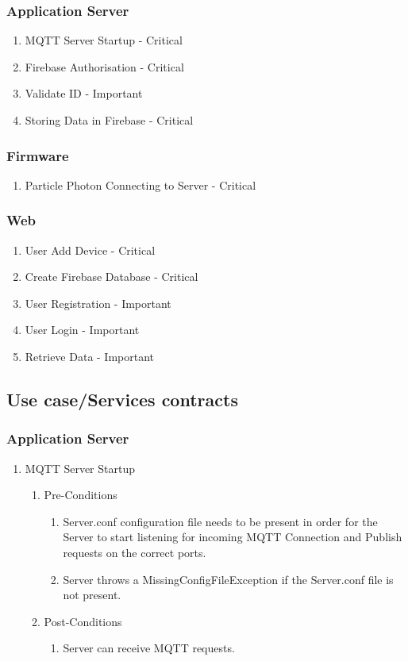 \documentclass{article}
\begin{document}
\subsubsection{Application Server}
\begin{enumerate}
	\item	MQTT Server Startup - Critical
	\item	Firebase Authorisation - Critical
	\item	Validate ID - Important
	\item	Storing Data in Firebase - Critical
\end{enumerate}
\subsubsection{Firmware}
\begin{enumerate}
	\item	Particle Photon Connecting to Server - Critical
\end{enumerate}
\subsubsection{Web}
\begin{enumerate}
	\item	User Add Device - Critical
	\item	Create Firebase Database - Critical
	\item	User Registration - Important
	\item	User Login - Important
	\item	Retrieve Data  - Important
\end{enumerate}
\subsection{Use case/Services contracts}
\subsubsection{Application Server}
\begin{enumerate}
	\item	MQTT Server Startup
	\begin{enumerate}
		\item  Pre-Conditions
		\begin{enumerate}
			\item  	Server.conf configuration file needs to be present in order for the Server to start listening for incoming MQTT Connection and 
			Publish requests on the correct ports.
			\item	Server throws a MissingConfigFileException if the Server.conf file is not present.
		\end{enumerate}
		\item  Post-Conditions		
		\begin{enumerate}
			\item	Server can receive MQTT requests.
		\end{enumerate}
	\end{enumerate}
		\end{enumerate}
\end{document}

